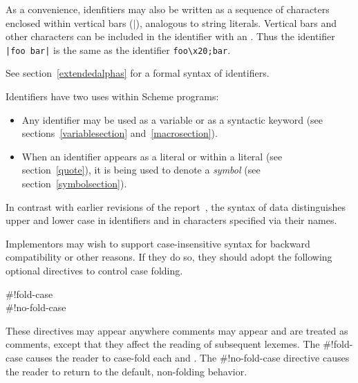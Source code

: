 As a convenience, idenfitiers may also be written as a sequence of
characters enclosed within vertical bars ({\cf $|$}), analogous to
string literals.  Vertical bars and other characters can be included
in the identifier with an .  Thus the
identifier \verb+|foo bar|+ is the same as the identifier
\verb+foo\x20;bar+.

See section~\ref{extendedalphas} for a formal syntax of identifiers.

\vest Identifiers have two uses within Scheme programs:
\begin{itemize}
\item Any identifier may be used as a variable
 or as a syntactic keyword
(see sections~\ref{variablesection} and~\ref{macrosection}).

\item When an identifier appears as a literal or within a literal
(see section~\ref{quote}), it is being used to denote a {\em symbol}
(see section~\ref{symbolsection}).
\end{itemize}

In contrast with earlier revisions of the report~\cite{R5RS}, the
syntax of data distinguishes upper and lower case in identifiers and in
characters specified via their names.

Implementors may wish to support case-insensitive syntax for backward
compatibility or other reasons.
If they do so, they should adopt the following optional directives
to control case folding.

\begin{entry}{%
{\cf{}\#!fold-case}\\
{\cf{}\#!no-fold-case}}

These directives may appear anywhere comments may appear and are
treated as comments, except that they affect the reading of subsequent
lexemes.
The {\cf{}\#!fold-case} causes the reader to case-fold
each  and .
The {\cf{}\#!no-fold-case} directive causes the reader to return
to the default, non-folding behavior.
\end{entry}

%
%


